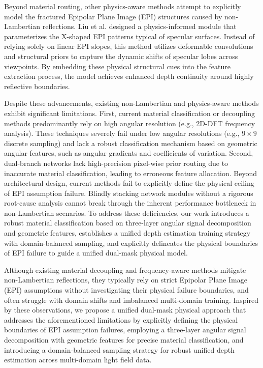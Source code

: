 Beyond material routing, other physics-aware methods attempt to explicitly model the fractured Epipolar Plane Image (EPI) structures caused by non-Lambertian reflections. Liu et al. designed a physics-informed module that parameterizes the X-shaped EPI patterns typical of specular surfaces. Instead of relying solely on linear EPI slopes, this method utilizes deformable convolutions and structural priors to capture the dynamic shifts of specular lobes across viewpoints. By embedding these physical structural cues into the feature extraction process, the model achieves enhanced depth continuity around highly reflective boundaries.

Despite these advancements, existing non-Lambertian and physics-aware methods exhibit significant limitations. First, current material classification or decoupling methods predominantly rely on high angular resolution (e.g., 2D-DFT frequency analysis). These techniques severely fail under low angular resolutions (e.g., $9 \times 9$ discrete sampling) and lack a robust classification mechanism based on geometric angular features, such as angular gradients and coefficients of variation. Second, dual-branch networks lack high-precision pixel-wise prior routing due to inaccurate material classification, leading to erroneous feature allocation. Beyond architectural design, current methods fail to explicitly define the physical ceiling of EPI assumption failure. Blindly stacking network modules without a rigorous root-cause analysis cannot break through the inherent performance bottleneck in non-Lambertian scenarios. To address these deficiencies, our work introduces a robust material classification based on three-layer angular signal decomposition and geometric features, establishes a unified depth estimation training strategy with domain-balanced sampling, and explicitly delineates the physical boundaries of EPI failure to guide a unified dual-mask physical model.

Although existing material decoupling and frequency-aware methods mitigate non-Lambertian reflections, they typically rely on strict Epipolar Plane Image (EPI) assumptions without investigating their physical failure boundaries, and often struggle with domain shifts and imbalanced multi-domain training. Inspired by these observations, we propose a unified dual-mask physical approach that addresses the aforementioned limitations by explicitly defining the physical boundaries of EPI assumption failures, employing a three-layer angular signal decomposition with geometric features for precise material classification, and introducing a domain-balanced sampling strategy for robust unified depth estimation across multi-domain light field data.
